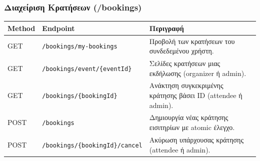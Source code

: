 \documentclass[12pt]{fphw}
\newcommand{\en}[1]{\foreignlanguage{english}{#1}}
\begin{document}
\subsubsection{Διαχείριση Κρατήσεων (/bookings)}
\begin{table}[h!]
    \centering
    \small
    \begin{tabularx}{\textwidth}{llX}
    \toprule
    \textbf{Method} & \textbf{Endpoint} & \textbf{Περιγραφή} \\
    \midrule
    \en{GET} & \en{\texttt{/bookings/my-bookings}} & Προβολή των κρατήσεων του συνδεδεμένου χρήστη. \\
    \addlinespace[1pt]
    \en{GET} & \en{\texttt{/bookings/event/\{eventId\}}} & Σελίδες κρατήσεων μιας εκδήλωσης (\en{organizer} ή \en{admin}). \\
    \addlinespace[1pt]
    \en{GET} & \en{\texttt{/bookings/\{bookingId\}}} & Ανάκτηση συγκεκριμένης κράτησης βάσει \en{ID} (\en{attendee} ή \en{admin}). \\
    \addlinespace[1pt]
    \en{POST} & \en{\texttt{/bookings}} & Δημιουργία νέας κράτησης εισιτηρίων με \en{atomic} έλεγχο. \\
    \addlinespace[1pt]
    \en{POST} & \en{\texttt{/bookings/\{bookingId\}/cancel}} & Ακύρωση υπάρχουσας κράτησης (\en{attendee} ή \en{admin}). \\
    \bottomrule
    \end{tabularx}
\end{table}

\newpage
\end{document}
